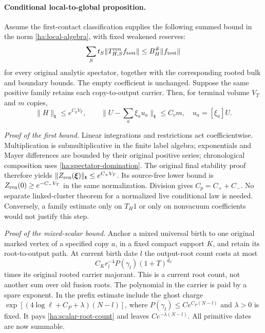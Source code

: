 \paragraph{Conditional local-to-global proposition.}
Assume the first-contact classification supplies the following summed
bound in the norm \eqref{ha:local-algebra}, with fixed weakened reserves:
\begin{equation}
 \sum_S t_S\|T^{\rm ren}_{H,S}f_{\rm test}\|
       \leq B_H^{\#}\|f_{\rm test}\|
 \label{ha:spectator-domination}
\end{equation}
for every original analytic spectator, together with the corresponding
rooted bulk and boundary bounds.  The empty coefficient is unchanged.
Suppose the same positive family retains each copy-to-output carrier.
Then, for terminal volume $V_T$ and $m$ copies,
\begin{equation}
 \|H\|_{\mathbf t}\leq e^{C_pV_T},
 \qquad
 \|U-\sum_a\xi_au_a\|_{\mathbf t}\leq C_vm,
 \quad u_a=[\xi_a]U.
 \label{ha:PV}
\end{equation}

\emph{Proof of the first bound.}
Linear integrations and restrictions act coefficientwise. Multiplication
is submultiplicative in the finite label algebra; exponentials and Mayer
differences are bounded by their original positive series; chronological
composition uses \eqref{ha:spectator-domination}.  The original final
stability proof therefore yields
$\|Z_{\rm ren}(\boldsymbol\xi)\|_{\mathbf t}\leq e^{C_+V_T}$.
Its source-free lower bound is
$Z_{\rm ren}(0)\geq e^{-C_-V_T}$ in the same normalization.  Division
gives $C_p=C_++C_-$.  No separate linked-cluster theorem for a normalized
live conditional law is needed.  Conversely, a family estimate only
on $T_H1$ or only on nonvacuum coefficients would not justify this step.

\emph{Proof of the mixed-scalar bound.}
Anchor a mixed universal birth to one original marked vertex of a
specified copy $a$, in a fixed compact support $K$, and retain its
root-to-output path.  At current birth date $l$ the output-root count
costs at most
\begin{equation}
 C_Kr_l^{-4}P(\gamma_l)(1+T)^{d_0}
 \label{ha:scalar-root-count}
\end{equation}
times its original rooted carrier majorant.  This is a current root
count, not another sum over old fusion roots.  The polynomial in the
carrier is paid by a spare exponent.  In the prefix estimate include
the ghost charge
$\exp[(4\log\ell+C_P+\lambda)(N-l)]$, where
$P(\gamma_l)\leq Ce^{C_P(N-l)}$ and $\lambda>0$ is fixed.
It pays \eqref{ha:scalar-root-count} and leaves
$Ce^{-\lambda(N-l)}$.  All primitive dates are now summable.

